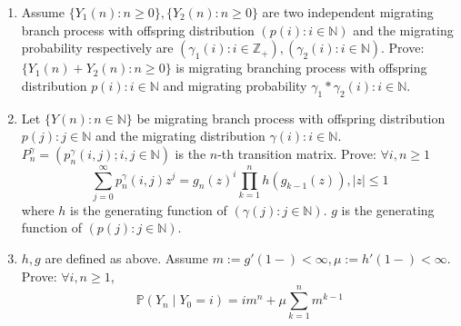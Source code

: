 \documentclass{ctexart}
\newif\ifpreface
\begin{document}
\large
\setlength{\baselineskip}{1.2em}
\ifpreface
  
\else
\fi
{}
\begin{problem}\label{pro:1}
  \begin{enumerate}
    \item Assume \(\{Y_1(n):n \geq 0\}, \{Y_2(n):n \geq 0\}\) are two independent migrating branch process with offspring distribution
      \((p(i):i \in \mathbb{N})\) and the migrating probability respectively are \((\gamma_1(i): i \in \mathbb{Z}_{+}),(\gamma_2(i): i \in \mathbb{N})\).
      Prove: \(\{Y_1(n )+ Y_2(n): n \geq 0\}\) is migrating branching process with offspring distribution \(p(i): i \in \mathbb{N}\)
      and migrating probability \(\gamma_1 * \gamma_2(i): i \in \mathbb{N}\).
    \item Let \(\{Y(n): n \in \mathbb{N}\}\) be migrating branch process with offspring distribution \(p(j): j \in \mathbb{N}\)
      and the migrating distribution \(\gamma(i): i \in \mathbb{N}\).
      \(P_n^\gamma=(p_n^\gamma (i,j); i,j \in \mathbb{N})\) is the \(n\)-th transition matrix.
      Prove: \(\forall i,n \geq 1\)
      \[
        \sum_{j=0}^{\infty} p_n^\gamma(i,j)z^j = g_n(z)^i \prod_{k=1}^{n} h(g_{k-1}(z)), |z| \leq 1
      \]
      where \(h\) is the generating function of \((\gamma(j): j \in \mathbb{N})\).
      \(g\) is the generating function of \((p(j): j \in \mathbb{N})\).
    \item \(h,g\) are defined as above. Assume \(m :=g'(1-) < \infty, \mu:=h'(1-) < \infty\).
      Prove: \(\forall i,n \geq 1\), \[
        \mathbb{P}(Y_n \mid Y_0 =i)=im^n + \mu \sum_{k=1}^{n} m^{k-1}
      \]
  \end{enumerate}
\end{problem}
\end{document}
